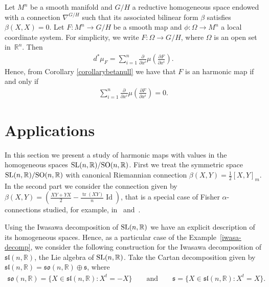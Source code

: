 \documentclass[10pt,a4paper]{amsart}
\numberwithin{equation}{section}
\begin{document}
\begin{Example}\label{superficieharmonic}
  Let $M^n$ be a smooth manifold  and $G/H$ a reductive homogeneous space endowed with a connection $\nabla^{G/H}$ such that its associated  bilinear form $\beta$ satisf\/ies $\beta(X,X) = 0$. Let $F\colon  M^n \rightarrow G/H$ be a smooth map and $\phi\colon \Omega \rightarrow M^n$ a local coordinate system.
   For simplicity, we write $F\colon\Omega \rightarrow G/H$, where $\Omega$ is an open set in~${\mathbb R}^n$. Then
  \begin{gather*}
    d^*\mu_{F} = \sum_{i=1}^n \frac{\partial}{\partial x^i}\mu\left(\frac{\partial F}{\partial x^i} \right).
  \end{gather*}
  Hence, from Corollary \ref{corollarybetanull} we have that   $F$ is an harmonic map if and only if
  \begin{gather*}
    \sum_{i=1}^n \frac{\partial}{\partial x^i}\mu\left(\frac{\partial F}{\partial x^i} \right) = 0.
  \end{gather*}
\end{Example}



\section{Applications}\label{section4}

In this section we present a study of harmonic maps with values in
the homogeneous spaces  ${\rm SL}(n,\mathbb{R})/{\rm
SO}(n,\mathbb{R})$. First we treat the symmetric space  ${\rm
SL}(n,\mathbb{R})/{\rm SO}(n,\mathbb{R})$ with canonical Riemannian
connection $\beta(X,Y) = \frac{1}{2}[X,Y]_m$. In the second part we
consider the  connection given by $\beta(X,Y) =
\left(\frac{XY+YX}{2} - \frac{\operatorname{tr}(XY)}{n}\operatorname{Id}\right)$, that is a
special case of Fisher $\alpha$-connections studied, for example, in~\cite{FernandesM/San-MartinL} and~\cite{FernandesM/San-MartinL2}.

Using the Iwasawa decomposition of ${\rm SL}(n,\mathbb{R})$ we have an explicit description of its homogeneous spaces. Hence, as a particular case of the Example~\ref{iwasa-decomp}, we consider the following construction for the Iwasawa decomposition of ${\mathfrak{sl}}(n, {\mathbb R})$, the Lie algebra of ${\rm SL}(n,\mathbb{R})$. Take the Cartan decomposition given by ${\mathfrak{sl}}(n, {\mathbb R})={\mathfrak{so}}(n,{\mathbb R}) \oplus {\mathfrak s}$, where
\begin{gather*}
  {\mathfrak{so}}(n,{\mathbb R})= \big\{ X \in {\mathfrak{sl}}(n, {\mathbb R})\colon  X^{t}=-X \big\} \qquad
  \mbox{and} \qquad {\mathfrak s}=\big\{X \in {\mathfrak{sl}}(n, {\mathbb R})\colon X^{t}=X \big\}.
\end{gather*}
\end{document}
